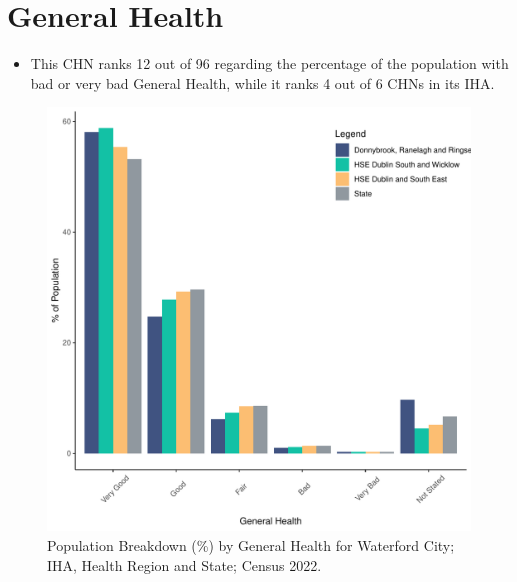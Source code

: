 \documentclass{article}
\begin{document}
\pagebreak

\section{General Health}\label{sect:GenHealth}
\begin{itemize}
\item  This CHN ranks  12 out of 96 regarding the percentage of the population with bad or very bad General Health, while it ranks   4 out of 6 CHNs in its IHA.
\end{itemize}
\begin{figure}[h]
	\centering
	\includegraphics[width = 150mm]{../figures/GenED.pdf}
	\caption{Population Breakdown (\%) by General Health for Waterford City; IHA, Health Region and State;  Census 2022.}
	\label{fig:2ae19629-1a6a-13a3-e055-000000000001}
	\end{figure}
\end{document}
